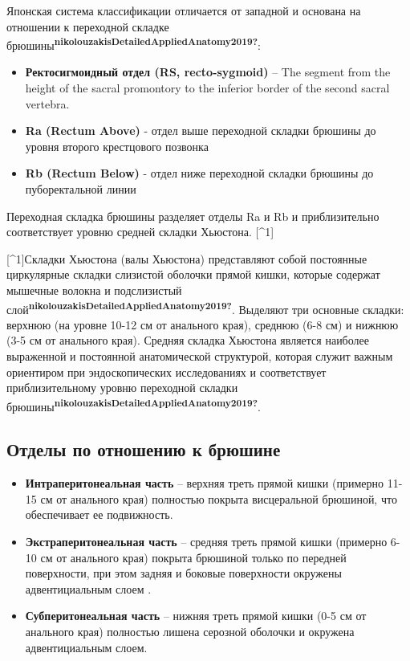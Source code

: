 \documentclass[
  russian,
  12pt,
  a4paper,
]{report}
\providecommand{\tightlist}{%
  \setlength{\itemsep}{0pt}\setlength{\parskip}{0pt}}
\begin{document}
Японская система классификации отличается от западной и основана на
отношении к переходной складке
брюшины\textsuperscript{\textbf{nikolouzakisDetailedAppliedAnatomy2019?}}:

\begin{itemize}
\tightlist
\item
  \textbf{Ректосигмоидный отдел (RS, recto-sygmoid)} -- The segment from
  the height of the sacral promontory to the inferior border of the
  second sacral vertebra.
\item
  \textbf{Ra (Rectum Above)} - отдел выше переходной складки брюшины до
  уровня второго крестцового позвонка
\item
  \textbf{Rb (Rectum Below)} - отдел ниже переходной складки брюшины до
  пуборектальной линии
\end{itemize}

Переходная складка брюшины разделяет отделы Ra и Rb и приблизительно
соответствует уровню средней складки Хьюстона. {[}\^{}1{]}

{[}\^{}1{]}Складки Хьюстона (валы Хьюстона) представляют собой
постоянные циркулярные складки слизистой оболочки прямой кишки, которые
содержат мышечные волокна и подслизистый
слой\textsuperscript{\textbf{nikolouzakisDetailedAppliedAnatomy2019?}}.
Выделяют три основные складки: верхнюю (на уровне 10-12 см от анального
края), среднюю (6-8 см) и нижнюю (3-5 см от анального края). Средняя
складка Хьюстона является наиболее выраженной и постоянной анатомической
структурой, которая служит важным ориентиром при эндоскопических
исследованиях и соответствует приблизительному уровню переходной складки
брюшины\textsuperscript{\textbf{nikolouzakisDetailedAppliedAnatomy2019?}}.

\subsection{Отделы по отношению к
брюшине}\label{ux43eux442ux434ux435ux43bux44b-ux43fux43e-ux43eux442ux43dux43eux448ux435ux43dux438ux44e-ux43a-ux431ux440ux44eux448ux438ux43dux435}

\begin{itemize}
\item
  \textbf{Интраперитонеальная часть} -- верхняя треть прямой кишки
  (примерно 11-15 см от анального края) полностью покрыта висцеральной
  брюшиной, что обеспечивает ее подвижность.
\item
  \textbf{Экстраперитонеальная часть} -- средняя треть прямой кишки
  (примерно 6-10 см от анального края) покрыта брюшиной только по
  передней поверхности, при этом задняя и боковые поверхности окружены
  адвентициальным слоем .
\item
  \textbf{Субперитонеальная часть} -- нижняя треть прямой кишки (0-5 см
  от анального края) полностью лишена серозной оболочки и окружена
  адвентициальным слоем.
\end{itemize}
\end{document}
